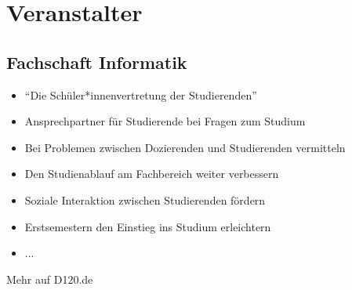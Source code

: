 

\usepackage{listings}
\usepackage{tikz}



\subtitle{Organisatorisches}
\maketitle

\section{Veranstalter}
\subsection*{Fachschaft Informatik}
\begin{frame}
    \slidehead
    \begin{itemize}
        \item "`Die Schüler*innenvertretung der Studierenden"'
        \item Ansprechpartner für Studierende bei Fragen zum Studium
        \item Bei Problemen zwischen Dozierenden und Studierenden vermitteln
        \item Den Studienablauf am Fachbereich weiter verbessern
        \item Soziale Interaktion zwischen Studierenden fördern
        \item Erstsemestern den Einstieg ins Studium erleichtern
        \item ...
    \end{itemize}
    \centering
    \vspace{3mm}
    \huge Mehr auf D120.de
\end{frame}

